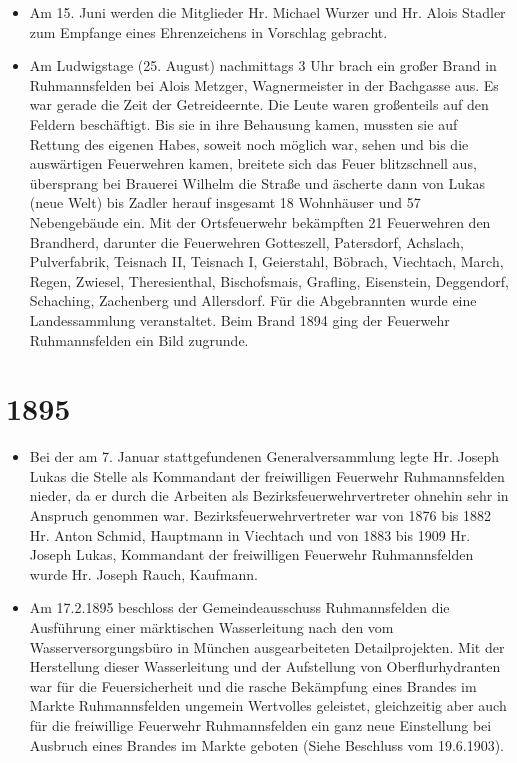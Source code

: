 \documentclass[12pt,a4paper]{book}
\begin{document}
\begin{itemize}
\item Am 15. Juni werden die Mitglieder Hr. Michael Wurzer und Hr. Alois Stadler
zum Empfange eines Ehrenzeichens in Vorschlag gebracht.

\item Am Ludwigstage (25. August) nachmittags 3 Uhr brach ein großer Brand in
Ruhmannsfelden bei Alois Metzger, Wagnermeister in der Bachgasse aus. Es war
gerade die Zeit der Getreideernte. Die Leute waren großenteils auf den Feldern
beschäftigt. Bis sie in ihre Behausung kamen, mussten sie auf Rettung des
eigenen Habes, soweit noch möglich war, sehen und bis die auswärtigen
Feuerwehren kamen, breitete sich das Feuer blitzschnell aus, übersprang bei
Brauerei Wilhelm die Straße und äscherte dann von Lukas (neue Welt) bis Zadler
herauf insgesamt 18 Wohnhäuser und 57 Nebengebäude ein. Mit der Ortsfeuerwehr
bekämpften 21 Feuerwehren den Brandherd, darunter die Feuerwehren Gotteszell,
Patersdorf, Achslach, Pulverfabrik, Teisnach II, Teisnach I, Geierstahl,
Böbrach, Viechtach, March, Regen, Zwiesel, Theresienthal, Bischofsmais,
Grafling, Eisenstein, Deggendorf, Schaching, Zachenberg und Allersdorf. Für die
Abgebrannten wurde eine Landessammlung veranstaltet. Beim Brand 1894 ging der
Feuerwehr Ruhmannsfelden ein Bild zugrunde.
\end{itemize}

\section*{1895}

\begin{itemize}
\item Bei der am 7. Januar stattgefundenen Generalversammlung legte Hr. Joseph
Lukas die Stelle als Kommandant der freiwilligen Feuerwehr Ruhmannsfelden
nieder, da er durch die Arbeiten als Bezirksfeuerwehrvertreter ohnehin sehr in
Anspruch genommen war. Bezirksfeuerwehrvertreter war von 1876 bis 1882 Hr. Anton
Schmid, Hauptmann in Viechtach und von 1883 bis 1909 Hr. Joseph Lukas,
Kommandant der freiwilligen Feuerwehr Ruhmannsfelden wurde Hr. Joseph Rauch,
Kaufmann.

\item Am 17.2.1895 beschloss der Gemeindeausschuss Ruhmannsfelden die Ausführung
einer märktischen Wasserleitung nach den vom Wasserversorgungsbüro in München
ausgearbeiteten Detailprojekten. Mit der Herstellung dieser Wasserleitung und
der Aufstellung von Oberflurhydranten war für die Feuersicherheit und die rasche
Bekämpfung eines Brandes im Markte Ruhmannsfelden ungemein Wertvolles geleistet,
gleichzeitig aber auch für die freiwillige Feuerwehr Ruhmannsfelden ein ganz
neue Einstellung bei Ausbruch eines Brandes im Markte geboten (Siehe Beschluss
vom 19.6.1903).
\end{itemize}
\end{document}
